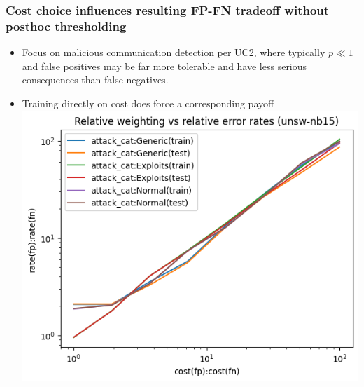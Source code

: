\documentclass{beamer}
\begin{document}
\begin{frame}
\frametitle{Cost choice influences resulting FP-FN tradeoff without posthoc thresholding}
\begin{itemize}
\item
Focus on malicious communication detection per UC2, where typically $p\ll 1$ and false positives may be far more tolerable and have less serious consequences than false negatives.
\item
  Training directly on cost does force a corresponding payoff
  \includegraphics[scale=0.35]{fpfn_tradeoff_effect.png}
%
\end{itemize}
\end{frame}
\end{document}
